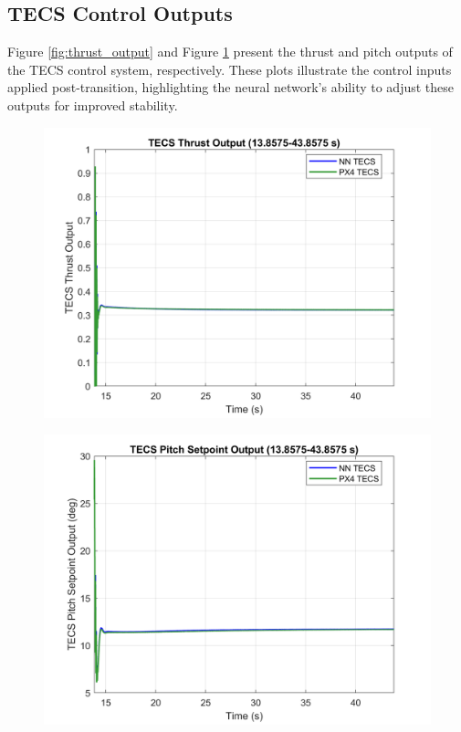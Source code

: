 \documentclass[journal,article,submit,pdftex,moreauthors]{Definitions/mdpi}
\begin{document}
\subsection{TECS Control Outputs}
Figure \ref{fig:thrust_output} and Figure \ref{fig:pitch_output} present the thrust and pitch outputs of the TECS control system, respectively. These plots illustrate the control inputs applied post-transition, highlighting the neural network's ability to adjust these outputs for improved stability.

\begin{figure}[H]
    \centering
    \begin{minipage}{0.45\textwidth}
        \centering
        \includegraphics[width=\linewidth]{figures/thrust_output_plot.png}
        \label{fig:thrust_output}
    \end{minipage}
    \hfill
    \begin{minipage}{0.45\textwidth}
        \centering
        \includegraphics[width=\linewidth]{figures/pitch_output_plot.png}
        \label{fig:pitch_output}
    \end{minipage}
\end{figure}
\end{document}
